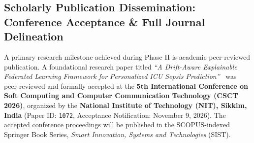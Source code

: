 \documentclass[11pt, a4paper]{article}
\begin{document}
\subsection{Scholarly Publication Dissemination: Conference Acceptance \& Full Journal Delineation}
A primary research milestone achieved during Phase II is academic peer-reviewed publication. A foundational research paper titled \textit{``A Drift-Aware Explainable Federated Learning Framework for Personalized ICU Sepsis Prediction''}~\cite{sakhi2026drift} was peer-reviewed and formally accepted at the \textbf{5th International Conference on Soft Computing and Computer Communication Technology (CSCT 2026)}, organized by the \textbf{National Institute of Technology (NIT), Sikkim, India} (Paper ID: \texttt{1072}, Acceptance Notification: November 9, 2026). The accepted conference proceedings will be published in the SCOPUS-indexed Springer Book Series, \textit{Smart Innovation, Systems and Technologies} (SIST).
\end{document}
